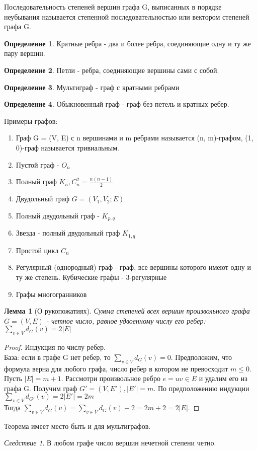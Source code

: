 \documentclass[a4paper]{article}
\newtheorem{lemma}{Лемма}[section]
\theoremstyle{definition}
\newtheorem*{definition}{Определение}
\theoremstyle{remark}
\newtheorem*{corollary}{Следствие}
\begin{document}
\begin{multicols*}{2}
    Последовательность степеней вершин графа G, выписанных в порядке неубывания называется степенной
    последовательностью или вектором степеней графа G.
    \begin{definition}
        Кратные ребра - два и более ребра, соединяющие одну и ту же пару вершин.
    \end{definition}
    \begin{definition}
        Петли - ребра, соединяющие вершины сами с собой.
    \end{definition}
    \begin{definition}
        Мультиграф - граф с кратными ребрами
    \end{definition}
    \begin{definition}
        Обыкновенный граф - граф без петель и кратных ребер.
    \end{definition}
    Примеры графов:
    \begin{enumerate}
        \item Граф G = (V, E) с n вершинами и m ребрами называется (n, m)-графом,
        (1, 0)-граф называется тривиальным.
        \item Пустой граф - $O_n$
        \item Полный граф $K_n, C_n^2 = \frac{n(n-1)}{2}$
        \item Двудольный граф $G = (V_1, V_2; E)$
        \item Полный двудольный граф - $K_{p,q}$
        \item Звезда - полный двудольный граф $K_{1,q}$
        \item Простой цикл $C_n$
        \item Регулярный (однородный) граф - граф, все вершины которого имеют
        одну и ту же степень. 
        Кубические графы - 3-регулярные
        \item Графы многогранников 
    \end{enumerate}
    \begin{lemma}[О рукопожатиях]
        Сумма степеней всех вершин произвольного графа $G = (V, E)$ - четное число, равное удвоенному
        числу его ребер:
        $\sum_{v\in V} d_G(v) = 2|E|$
    \end{lemma}
    \begin{proof}
        Индукция по числу ребер.\\
        База: если в графе G нет ребер, то $\sum_{v\in V} d_G(v) = 0$.
        Предположим, что формула верна для любого графа, число ребер в котором не превосходит $m\leq 0$.\\
        Пусть $|E| = m+1$. Рассмотри произвольное ребро $e = uv\in E$ и удалим его из графа G. Получим граф
        $G' = (V, E'), |E'| = m$. По предположению индукции $\sum_{v\in V} d_{G'}(v) = 2 |E'| = 2m$\\
        Тогда $\sum_{v\in V} d_{G}(v) = \sum_{v\in V} d_G(v) + 2 = 2m + 2 = 2|E|$.
    \end{proof}
    Теорема имеет место быть и для мультиграфов.
    \begin{corollary}
        В любом графе число вершин нечетной степени четно.
    \end{corollary}

\end{multicols*}
\end{document}
